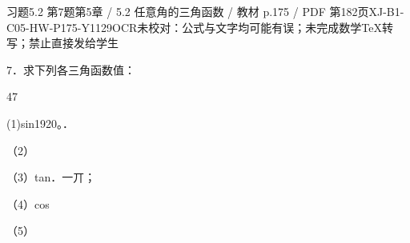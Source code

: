 \begin{bankitem}{习题5.2 第7题}{第5章 / 5.2 任意角的三角函数 / 教材 p.175 / PDF 第182页}{XJ-B1-C05-HW-P175-Y1129}{OCR未校对：公式与文字均可能有误；未完成数学TeX转写；禁止直接发给学生}
\begin{ocrdraft}
\par
7．求下列各三角函数值：
\par
47
\par
(1)sin1920。．
\par
（2）
\par
（3）tan．一丌；
\par
（4）cos
\par
（5）
\end{ocrdraft}
\end{bankitem}
